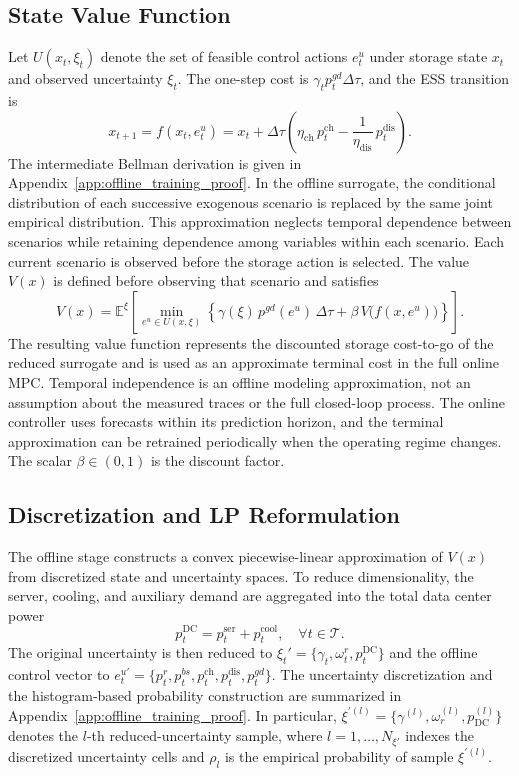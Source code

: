 \documentclass[a4paper,fleqn]{cas-dc}
\theoremstyle{plain}
\theoremstyle{remark}
\theoremstyle{plain}
\begin{document}
\subsection{State Value Function}
Let $U(x_t,\xi_t)$ denote the set of feasible control actions $e_t^u$ under storage state $x_t$ and observed uncertainty $\xi_t$.
The one-step cost is $\gamma_t p_t^{gd}\Delta\tau$, and the ESS transition is
\[
x_{t+1}=f(x_t,e_t^u)
=x_t+\Delta \tau\!\left(\eta_{\text{ch}}\, p_t^{\text{ch}}-\frac{1}{\eta_{\text{dis}}}\, p_t^{\text{dis}}\right).
\]
The intermediate Bellman derivation is given in Appendix~\ref{app:offline_training_proof}. In the offline surrogate, the conditional distribution of each successive exogenous scenario is replaced by the same joint empirical distribution. This approximation neglects temporal dependence between scenarios while retaining dependence among variables within each scenario. Each current scenario is observed before the storage action is selected. The value $V(x)$ is defined before observing that scenario and satisfies
\begin{equation}\label{eq:bellman_stationary}
V(x)=\mathbb{E}^{\xi}\!\left[
\min_{e^u \in U(x,\xi)}
\left\{\gamma(\xi)\, p^{gd}(e^u)\, \Delta\tau+\beta\, V\!\big(f(x,e^u)\big)\right\}
\right].
\end{equation}
The resulting value function represents the discounted storage cost-to-go of the reduced surrogate and is used as an approximate terminal cost in the full online MPC. Temporal independence is an offline modeling approximation, not an assumption about the measured traces or the full closed-loop process. The online controller uses forecasts within its prediction horizon, and the terminal approximation can be retrained periodically when the operating regime changes.
The scalar $\beta\in(0,1)$ is the discount factor.

\subsection{Discretization and LP Reformulation}
The offline stage constructs a convex piecewise-linear approximation of $V(x)$ from discretized state and uncertainty spaces. To reduce dimensionality, the server, cooling, and auxiliary demand are aggregated into the total data center power
\begin{equation}\label{eq:pdc}
    p_t^{\text{DC}} = p_t^{\text{ser}} + p_t^{\text{cool}}, \quad \forall t \in \mathcal{T}.
\end{equation}
The original uncertainty is then reduced to $\xi_t'=\{\gamma_t,\omega_t^r,p_t^{\text{DC}}\}$ and the offline control vector to $e_t^{u'}=\{p_t^r,p_t^{bs},p_t^{\text{ch}},p_t^{\text{dis}},p_t^{gd}\}$. The uncertainty discretization and the histogram-based probability construction are summarized in Appendix~\ref{app:offline_training_proof}. In particular, $\xi^{\prime(l)}=\{\gamma^{(l)},\omega_r^{(l)},p_{\mathrm{DC}}^{(l)}\}$ denotes the $l$-th reduced-uncertainty sample, where $l=1,\ldots,N_{\xi'}$ indexes the discretized uncertainty cells and $\rho_l$ is the empirical probability of sample $\xi^{\prime(l)}$.
\end{document}

